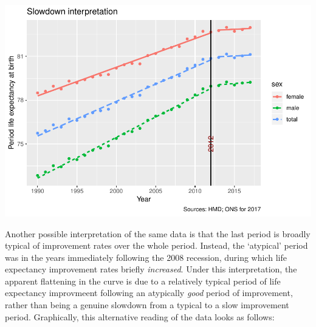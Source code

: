 \documentclass[]{article}
\begin{document}
\includegraphics{devils_advocacy_files/figure-latex/unnamed-chunk-2-1.pdf}

Another possible interpretation of the same data is that the last period
is broadly typical of improvement rates over the whole period. Instead,
the `atypical' period was in the years immediately following the 2008
recession, during which life expectancy improvement rates briefly
\emph{increased}. Under this interpretation, the apparent flattening in
the curve is due to a relatively typical period of life expectancy
improvmeent following an atypically \emph{good} period of improvement,
rather than being a genuine slowdown from a typical to a slow
improvement period. Graphically, this alternative reading of the data
looks as follows:
\end{document}
